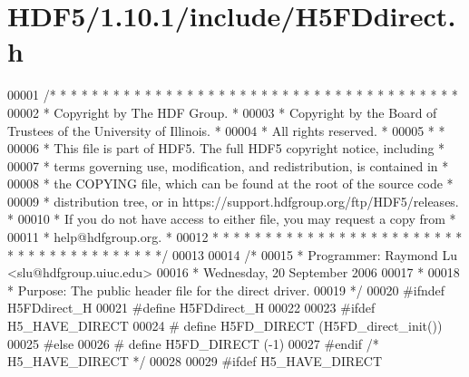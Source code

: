 \hypertarget{_h_d_f5_21_810_81_2include_2_h5_f_ddirect_8h_source}{}\section{H\+D\+F5/1.10.1/include/\+H5\+F\+Ddirect.h}
\label{_h_d_f5_21_810_81_2include_2_h5_f_ddirect_8h_source}

\begin{DoxyCode}
00001 \textcolor{comment}{/* * * * * * * * * * * * * * * * * * * * * * * * * * * * * * * * * * * * * * *}
00002 \textcolor{comment}{ * Copyright by The HDF Group.                                               *}
00003 \textcolor{comment}{ * Copyright by the Board of Trustees of the University of Illinois.         *}
00004 \textcolor{comment}{ * All rights reserved.                                                      *}
00005 \textcolor{comment}{ *                                                                           *}
00006 \textcolor{comment}{ * This file is part of HDF5.  The full HDF5 copyright notice, including     *}
00007 \textcolor{comment}{ * terms governing use, modification, and redistribution, is contained in    *}
00008 \textcolor{comment}{ * the COPYING file, which can be found at the root of the source code       *}
00009 \textcolor{comment}{ * distribution tree, or in https://support.hdfgroup.org/ftp/HDF5/releases.  *}
00010 \textcolor{comment}{ * If you do not have access to either file, you may request a copy from     *}
00011 \textcolor{comment}{ * help@hdfgroup.org.                                                        *}
00012 \textcolor{comment}{ * * * * * * * * * * * * * * * * * * * * * * * * * * * * * * * * * * * * * * */}
00013 
00014 \textcolor{comment}{/*}
00015 \textcolor{comment}{ * Programmer:  Raymond Lu <slu@hdfgroup.uiuc.edu>}
00016 \textcolor{comment}{ *              Wednesday, 20 September 2006}
00017 \textcolor{comment}{ *}
00018 \textcolor{comment}{ * Purpose: The public header file for the direct driver.}
00019 \textcolor{comment}{ */}
00020 \textcolor{preprocessor}{#ifndef H5FDdirect\_H}
00021 \textcolor{preprocessor}{#define H5FDdirect\_H}
00022 
00023 \textcolor{preprocessor}{#ifdef H5\_HAVE\_DIRECT}
00024 \textcolor{preprocessor}{#       define H5FD\_DIRECT  (H5FD\_direct\_init())}
00025 \textcolor{preprocessor}{#else}
00026 \textcolor{preprocessor}{#       define H5FD\_DIRECT      (-1)}
00027 \textcolor{preprocessor}{#endif }\textcolor{comment}{/* H5\_HAVE\_DIRECT */}\textcolor{preprocessor}{}
00028 
00029 \textcolor{preprocessor}{#ifdef H5\_HAVE\_DIRECT}

\end{DoxyCode}
